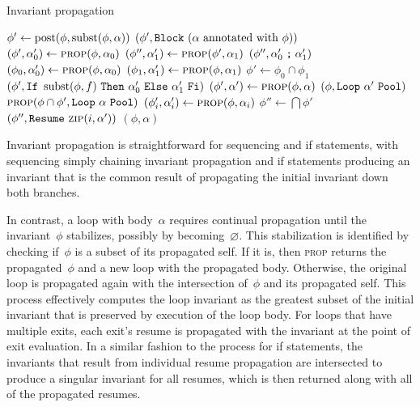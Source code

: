 \begin{algorithm}
  \caption{Invariant propagation}\label{algo:prop}
  \begin{algorithmic}
      \State $\phi'\gets\operatorname{post}(\phi,\operatorname{subst}(\phi,\alpha))$
      \State\Return $(\phi',\texttt{Block}~(\alpha\text{ annotated with }\phi))$
    \EndFunction
      \State $(\phi',\alpha_0')\gets\Call{prop}{\phi,\alpha_0}$
      \State $(\phi'',\alpha_1')\gets\Call{prop}{\phi',\alpha_1}$
      \State\Return $(\phi'',\alpha_0'\mathrel{\texttt{;}} \alpha_1')$
    \EndFunction
      \State $(\phi_0,\alpha'_0)\gets\Call{prop}{\phi,\alpha_0}$
      \State $(\phi_1,\alpha'_1)\gets\Call{prop}{\phi,\alpha_1}$
      \State $\phi'\gets\phi_0\cap\phi_1$
      \State\Return $(\phi',\texttt{If}~\operatorname{subst}(\phi,f)~\texttt{Then}~
        \alpha'_0~\texttt{Else}~\alpha'_1~\texttt{Fi})$
    \EndFunction
      \State $(\phi',\alpha')\gets\Call{prop}{\phi,\alpha}$
        \State\Return $(\phi,\texttt{Loop}~\alpha'~\texttt{Pool})$
      \Else
        \State\Return $\Call{prop}{\phi\cap\phi',\AWhile~\alpha~\AOd}$
      \EndIf
    \EndFunction
        \State $(\phi'_i,\alpha'_i)\gets\Call{prop}{\phi,\alpha_i}$
      \EndFor
      \State $\phi''\gets\bigcap\phi'$
      \State\Return $(\phi'',\AWhileResume~\Call{zip}{i,\alpha'})$
    \EndFunction
      \State\Return $(\phi,\alpha)$
    \EndFunction
  \end{algorithmic}
\end{algorithm}
Invariant propagation is straightforward for sequencing and if statements,
with sequencing simply chaining invariant propagation
and if statements producing an invariant that is the common result
of propagating the initial invariant down both branches.

In contrast, a loop with body~$\alpha$ requires continual propagation
until the invariant~$\phi$ stabilizes, possibly by becoming~$\varnothing$.
This stabilization is identified
by checking if~$\phi$ is a subset of its propagated self.
If it is, then \textsc{prop} returns the propagated~$\phi$
and a new loop with the propagated body.
Otherwise,
the original loop is propagated again with the intersection of~$\phi$
and its propagated self.
This process effectively computes the loop invariant
as the greatest subset of the initial invariant
that is preserved by execution of the loop body.
For loops that have multiple exits,
each exit's resume is propagated with the invariant at the point of exit evaluation.
In a similar fashion to the process for if statements,
the invariants that result from individual resume propagation
are intersected to produce a singular invariant for all resumes,
which is then returned along with all of the propagated resumes.

